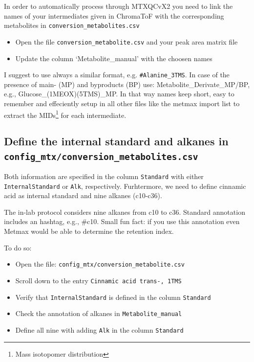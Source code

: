 \documentclass[]{book}
\providecommand{\tightlist}{%
  \setlength{\itemsep}{0pt}\setlength{\parskip}{0pt}}
\let\rmarkdownfootnote\footnote%
\def\footnote{\protect\rmarkdownfootnote}
\theoremstyle{definition}
\theoremstyle{definition}
\theoremstyle{definition}
\theoremstyle{remark}
\begin{document}
In order to automatically process through MTXQCvX2 you need to link the
names of your intermediates given in ChromaToF with the corresponding
metabolites in \texttt{conversion\_metabolites.csv}

\begin{itemize}
\tightlist
\item
  Open the file \texttt{conversion\_metabolite.csv} and your peak area
  matrix file
\item
  Update the column `Metabolite\_manual' with the choosen names
\end{itemize}

I suggest to use always a similar format, e.g. \texttt{\#Alanine\_3TMS}.
In case of the presence of main- (MP) and byproducts (BP) use:
Metabolite\_Derivate\_MP/BP, e.g., Glucose\_(1MEOX)(5TMS)\_MP. In that
way names keep short, easy to remember and effeciently setup in all
other files like the metmax import list to extract the MIDs\footnote{Mass
  isotopomer distribution} for each intermediate.

\subsection{\texorpdfstring{Define the internal standard and alkanes in
\texttt{config\_mtx/conversion\_metabolites.csv}}{Define the internal standard and alkanes in config\_mtx/conversion\_metabolites.csv}}\label{define-the-internal-standard-and-alkanes-in-config_mtxconversion_metabolites.csv}

Both information are specified in the column \texttt{Standard} with
either \texttt{InternalStandard} or \texttt{Alk}, respectively.
Furhtermore, we need to define cinnamic acid as internal standard and
nine alkanes (c10-c36).

The in-lab protocol considers nine alkanes from c10 to c36. Standard
annotation includes an hashtag, e.g., \#c10. Small fun fact: if you use
this annotation even Metmax would be able to determine the retention
index.

To do so:

\begin{itemize}
\tightlist
\item
  Open the file: \texttt{config\_mtx/conversion\_metabolite.csv}
\item
  Scroll down to the entry \texttt{Cinnamic\ acid\ trans-,\ 1TMS}
\item
  Verify that \texttt{InternalStandard} is defined in the column
  \texttt{Standard}
\item
  Check the annotation of alkanes in \texttt{Metabolite\_manual}
\item
  Define all nine with adding \texttt{Alk} in the column
  \texttt{Standard}
\end{itemize}
\end{document}
